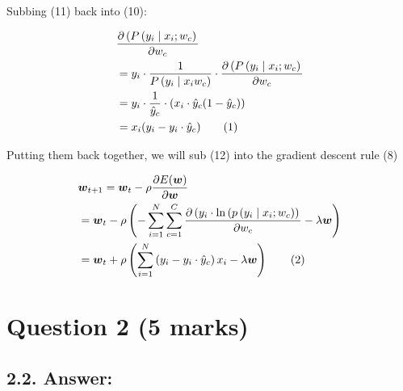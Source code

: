 \documentclass{article}
\newcommand\numberthis{\addtocounter{equation}{1}\tag{\theequation}}
\begin{document}
Subbing (11) back into (10):

\begin{align*}
    & \frac{\partial\left(P\left(y_i \mid x_i ; w_c\right)\right.}{\partial w_c} \\
    & = y_i \cdot \frac{1}{P\left(y_i \mid x_{i} w_c\right)} \cdot \frac{\partial\left(P\left(y_i \mid x_i ; w_c\right)\right.}{\partial w_c} \\
    & = y_i \cdot \frac{1}{\hat{y}_c} \cdot (x_i \cdot \hat{y}_c(1-\hat{y}_c)) \\
    & = x_i(y_i-y_i \cdot \hat{y}_c) \numberthis \label{eqn}
\end{align*}

Putting them back together, we will sub (12) into the gradient descent rule (8)

\begin{align*}
    & \boldsymbol{w}_{t+1}=\boldsymbol{w}_t-\rho \frac{\partial E(\boldsymbol{w})}{\partial \boldsymbol{w}} \\
    & =  \boldsymbol{w}_t-\rho \left(-\sum_{i=1}^N \sum_{c=1}^C \frac{\partial\left(y_i \cdot \ln \left(p\left(y_i \mid x_i ; w_c\right)\right)\right.}{\partial w_c} - \lambda \boldsymbol{w}\right) \\
    & = \boldsymbol{w}_t+\rho \left(\sum_{i=1}^N \left(y_i-y_i \cdot \hat{y}_c\right)x_i - \lambda \boldsymbol{w}\right) \numberthis \label{eqn}
\end{align*}


\section{Question 2 (5 marks)}

\subsection*{2.2. Answer:}
\begin{table}[!hbt]
    \centering
    \caption{Classification accuracy on running linear kernel SVM on 3-fold cross-validation using training set with different values of the parameter C in \{0.01, 0.05, 0.1, 0.5, 1\}}
    \label{tab:linearSVM}
\end{table}
\end{document}
